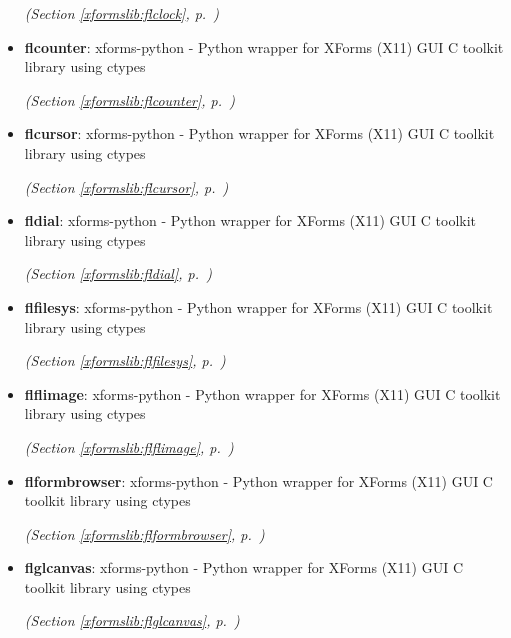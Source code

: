 \begin{itemize}
  \textit{(Section \ref{xformslib:flclock}, p.~\pageref{xformslib:flclock})}

\item \textbf{flcounter}: 
xforms-python - Python wrapper for XForms (X11) GUI C toolkit library
using ctypes




  \textit{(Section \ref{xformslib:flcounter}, p.~\pageref{xformslib:flcounter})}

\item \textbf{flcursor}: 
xforms-python - Python wrapper for XForms (X11) GUI C toolkit library
using ctypes




  \textit{(Section \ref{xformslib:flcursor}, p.~\pageref{xformslib:flcursor})}

\item \textbf{fldial}: 
xforms-python - Python wrapper for XForms (X11) GUI C toolkit library
using ctypes




  \textit{(Section \ref{xformslib:fldial}, p.~\pageref{xformslib:fldial})}

\item \textbf{flfilesys}: 
xforms-python - Python wrapper for XForms (X11) GUI C toolkit library
using ctypes




  \textit{(Section \ref{xformslib:flfilesys}, p.~\pageref{xformslib:flfilesys})}

\item \textbf{flflimage}: 
xforms-python - Python wrapper for XForms (X11) GUI C toolkit library
using ctypes




  \textit{(Section \ref{xformslib:flflimage}, p.~\pageref{xformslib:flflimage})}

\item \textbf{flformbrowser}: 
xforms-python - Python wrapper for XForms (X11) GUI C toolkit library
using ctypes




  \textit{(Section \ref{xformslib:flformbrowser}, p.~\pageref{xformslib:flformbrowser})}

\item \textbf{flglcanvas}: 
xforms-python - Python wrapper for XForms (X11) GUI C toolkit library
using ctypes




  \textit{(Section \ref{xformslib:flglcanvas}, p.~\pageref{xformslib:flglcanvas})}


\end{itemize}
